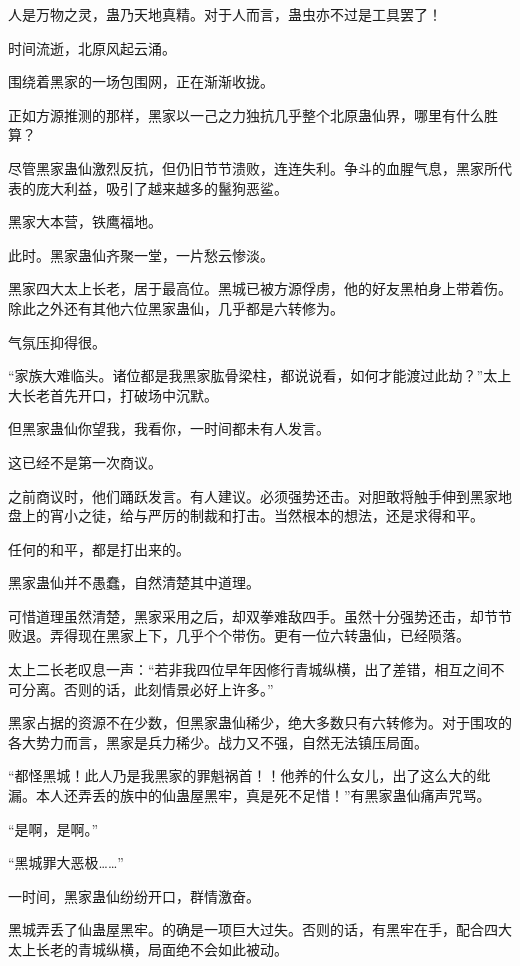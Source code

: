 \begin{this_body}
人是万物之灵，蛊乃天地真精。对于人而言，蛊虫亦不过是工具罢了！

时间流逝，北原风起云涌。

围绕着黑家的一场包围网，正在渐渐收拢。

正如方源推测的那样，黑家以一己之力独抗几乎整个北原蛊仙界，哪里有什么胜算？

尽管黑家蛊仙激烈反抗，但仍旧节节溃败，连连失利。争斗的血腥气息，黑家所代表的庞大利益，吸引了越来越多的鬣狗恶鲨。

黑家大本营，铁鹰福地。

此时。黑家蛊仙齐聚一堂，一片愁云惨淡。

黑家四大太上长老，居于最高位。黑城已被方源俘虏，他的好友黑柏身上带着伤。除此之外还有其他六位黑家蛊仙，几乎都是六转修为。

气氛压抑得很。

“家族大难临头。诸位都是我黑家肱骨梁柱，都说说看，如何才能渡过此劫？”太上大长老首先开口，打破场中沉默。

但黑家蛊仙你望我，我看你，一时间都未有人发言。

这已经不是第一次商议。

之前商议时，他们踊跃发言。有人建议。必须强势还击。对胆敢将触手伸到黑家地盘上的宵小之徒，给与严厉的制裁和打击。当然根本的想法，还是求得和平。

任何的和平，都是打出来的。

黑家蛊仙并不愚蠢，自然清楚其中道理。

可惜道理虽然清楚，黑家采用之后，却双拳难敌四手。虽然十分强势还击，却节节败退。弄得现在黑家上下，几乎个个带伤。更有一位六转蛊仙，已经陨落。

太上二长老叹息一声：“若非我四位早年因修行青城纵横，出了差错，相互之间不可分离。否则的话，此刻情景必好上许多。”

黑家占据的资源不在少数，但黑家蛊仙稀少，绝大多数只有六转修为。对于围攻的各大势力而言，黑家是兵力稀少。战力又不强，自然无法镇压局面。

“都怪黑城！此人乃是我黑家的罪魁祸首！！他养的什么女儿，出了这么大的纰漏。本人还弄丢的族中的仙蛊屋黑牢，真是死不足惜！”有黑家蛊仙痛声咒骂。

“是啊，是啊。”

“黑城罪大恶极……”

一时间，黑家蛊仙纷纷开口，群情激奋。

黑城弄丢了仙蛊屋黑牢。的确是一项巨大过失。否则的话，有黑牢在手，配合四大太上长老的青城纵横，局面绝不会如此被动。


\end{this_body}
